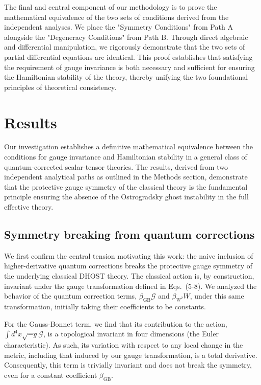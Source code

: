 \documentclass[twocolumn]{aastex631}
\begin{document}
The final and central component of our methodology is to prove the mathematical equivalence of the two sets of conditions derived from the independent analyses. We place the "Symmetry Conditions" from Path A alongside the "Degeneracy Conditions" from Path B. Through direct algebraic and differential manipulation, we rigorously demonstrate that the two sets of partial differential equations are identical. This proof establishes that satisfying the requirement of gauge invariance is both necessary and sufficient for ensuring the Hamiltonian stability of the theory, thereby unifying the two foundational principles of theoretical consistency.

\section{Results}
\label{sec:results}
Our investigation establishes a definitive mathematical equivalence between the conditions for gauge invariance and Hamiltonian stability in a general class of quantum-corrected scalar-tensor theories. The results, derived from two independent analytical paths as outlined in the Methods section, demonstrate that the protective gauge symmetry of the classical theory is the fundamental principle ensuring the absence of the Ostrogradsky ghost instability in the full effective theory.

\subsection{Symmetry breaking from quantum corrections}

We first confirm the central tension motivating this work: the naive inclusion of higher-derivative quantum corrections breaks the protective gauge symmetry of the underlying classical DHOST theory. The classical action is, by construction, invariant under the gauge transformation defined in Eqs.~(5-8). We analyzed the behavior of the quantum correction terms, $\beta_{\text{GB}}\mathcal{G}$ and $\beta_{W^2}W$, under this same transformation, initially taking their coefficients to be constants.

For the Gauss-Bonnet term, we find that its contribution to the action, $\int d^4x \sqrt{-g} \mathcal{G}$, is a topological invariant in four dimensions (the Euler characteristic). As such, its variation with respect to any local change in the metric, including that induced by our gauge transformation, is a total derivative. Consequently, this term is trivially invariant and does not break the symmetry, even for a constant coefficient $\beta_{\text{GB}}$.
\end{document}
